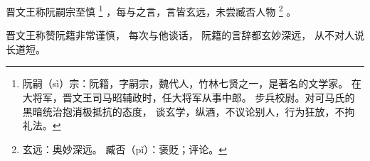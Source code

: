 
\switchcolumn*[\section{}]

晋文王称阮嗣宗至慎%
\footnote{%
    阮嗣（sì）宗：阮籍，字嗣宗，魏代人，竹林七贤之一，是著名的文学家。
                  在大将军，晋文王司马昭辅政时，任大将军从事中郎。
                  步兵校尉。对可马氏的黑暗统治抱消极抵抗的态度，
                  谈玄学，纵酒，不议论别人，行为狂放，不拘礼法。
}%
，每与之言，言皆玄远，未尝臧否人物%
\footnote{%
    玄远：奥妙深远。
    臧否（pǐ）：褒贬；评论。
}%
。

\switchcolumn

晋文王称赞阮籍非常谨慎，
每次与他谈话，
阮籍的言辞都玄妙深远，
从不对人说长道短。
